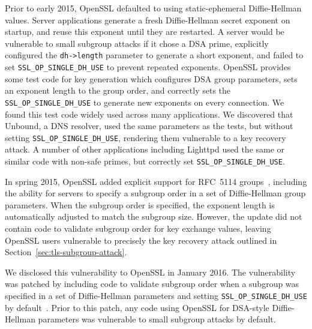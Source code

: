 Prior to early 2015, OpenSSL defaulted to using static-ephemeral Diffie-Hellman
values. Server applications generate a fresh Diffie-Hellman secret exponent on
startup, and reuse this exponent until they are restarted.  A server would be
vulnerable to small subgroup attacks if it chose a DSA prime, explicitly
configured the \texttt{dh->length} parameter to generate a short exponent, and
failed to set \texttt{SSL\_OP\_SINGLE\_DH\_USE} to prevent repeated exponents.
OpenSSL provides some test code for key generation which configures DSA group
parameters, sets an exponent length to the group order, and correctly sets the
\texttt{SSL\_OP\_SINGLE\_DH\_USE} to generate new exponents on every
connection.  We found this test code widely used across many applications.  We
discovered that Unbound, a DNS resolver, used the same parameters as the tests,
but without setting \texttt{SSL\_OP\_SINGLE\_DH\_USE}, rendering them
vulnerable to a key recovery attack.  A number of other applications including
Lighttpd used the same or similar code with non-safe primes, but correctly set
\texttt{SSL\_OP\_SINGLE\_DH\_USE}.

In spring 2015, OpenSSL added explicit support for RFC~5114
groups~\cite{openssl-changelog-102}, including the ability for servers to
specify a subgroup order in a set of Diffie-Hellman group parameters. When the
subgroup order is specified, the exponent length is automatically adjusted to
match the subgroup size.  However, the update did not contain code to validate
subgroup order for key exchange values, leaving OpenSSL users vulnerable to
precisely the key recovery attack outlined in
Section~\ref{sec:tls-subgroup-attack}.

We disclosed this vulnerability to OpenSSL in January 2016. The vulnerability
was patched by including code to validate subgroup order when a subgroup was
specified in a set of Diffie-Hellman parameters and setting
\texttt{SSL\_OP\_SINGLE\_DH\_USE} by default~\cite{openssl-secadv-subgroup}.
Prior to this patch, any code using OpenSSL for DSA-style Diffie-Hellman
parameters was vulnerable to small subgroup attacks by default.

\ApplicationsTable

